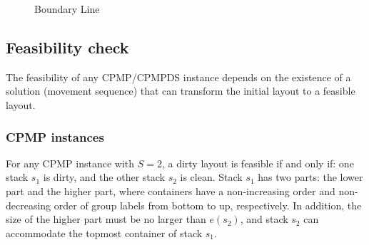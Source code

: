 \documentclass[review,3p,times,authoryear,12pt]{elsarticle}
\begin{document}
\begin{figure}[htbp]
\centering
{}
\caption{Boundary Line}
\label{fig4}
\end{figure}


\subsection{Feasibility check}

The feasibility of any CPMP/CPMPDS instance depends on the existence of a solution (movement sequence) that can transform the initial layout to a feasible layout.

\subsubsection{CPMP instances}

For any CPMP instance with $S=2$, a dirty layout is feasible if and only if: one stack $s_1$ is dirty, and the other stack $s_2$ is clean.
Stack $s_1$ has two parts: the lower part and the higher part, where containers have a non-increasing order and non-decreasing order of group labels from bottom to up, respectively.
In addition, the size of the higher part must be no larger than $e(s_2)$, and stack $s_2$ can accommodate the topmost container of stack $s_1$.
\end{document}
